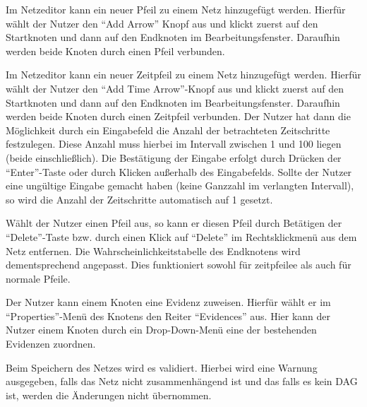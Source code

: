 \documentclass[parskip=full,11pt,twoside]{scrartcl}
\begin{document}
Im Netzeditor kann ein neuer Pfeil zu einem Netz hinzugefügt werden. Hierfür wählt der Nutzer den \enquote{Add Arrow} Knopf aus und klickt zuerst auf den Startknoten und dann auf den Endknoten im Bearbeitungsfenster. Daraufhin werden beide Knoten durch einen Pfeil verbunden. %


Im Netzeditor kann ein neuer Zeitpfeil zu einem Netz hinzugefügt werden. Hierfür wählt der Nutzer den \enquote{Add Time Arrow}-Knopf aus und klickt zuerst auf den Startknoten und dann auf den Endknoten im Bearbeitungsfenster. Daraufhin werden beide Knoten durch einen Zeitpfeil verbunden. Der Nutzer hat dann die Möglichkeit durch ein Eingabefeld die Anzahl der betrachteten Zeitschritte festzulegen. Diese Anzahl muss hierbei im Intervall zwischen 1 und 100 liegen (beide einschließlich). Die Bestätigung der Eingabe erfolgt durch Drücken der \enquote{Enter}-Taste oder durch Klicken außerhalb des Eingabefelds. Sollte der Nutzer eine ungültige Eingabe gemacht haben (keine Ganzzahl im verlangten Intervall), so wird die Anzahl der Zeitschritte automatisch auf 1 gesetzt.

Wählt der Nutzer einen Pfeil aus, so kann er diesen Pfeil durch Betätigen der \enquote{Delete}-Taste bzw. durch einen Klick auf \enquote{Delete} im Rechtsklickmenü aus dem Netz entfernen. Die Wahrscheinlichkeitstabelle des Endknotens wird dementsprechend angepasst. Dies funktioniert sowohl für \gls{zeitpfeile}e als auch für normale Pfeile.

Der Nutzer kann einem Knoten eine Evidenz zuweisen. Hierfür wählt er im \enquote{Properties}-Menü des Knotens den Reiter \enquote{Evidences} aus. Hier kann der Nutzer einem Knoten durch ein Drop-Down-Menü eine der bestehenden Evidenzen zuordnen. %

Beim Speichern des Netzes wird es validiert. Hierbei wird eine Warnung ausgegeben, falls das Netz nicht zusammenhängend ist und das falls es kein DAG ist, werden die Änderungen nicht übernommen.
\end{document}
